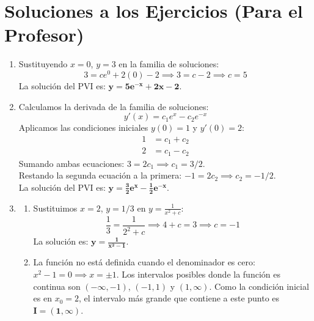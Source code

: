 \documentclass[12pt]{article}
\begin{document}
\newpage
\section*{Soluciones a los Ejercicios (Para el Profesor)}

\begin{enumerate}[label=\textbf{\arabic*.}]
    \item Sustituyendo $x=0$, $y=3$ en la familia de soluciones:
    \[ 3 = c e^{0} + 2(0) - 2 \implies 3 = c - 2 \implies c = 5 \]
    La solución del PVI es: $\mathbf{y = 5e^{-x} + 2x - 2}$.

    \vspace{0.5cm}

    \item Calculamos la derivada de la familia de soluciones:
    \[ y'(x) = c_1 e^x - c_2 e^{-x} \]
    Aplicamos las condiciones iniciales $y(0)=1$ y $y'(0)=2$:
    \begin{align*}
        1 &= c_1 + c_2 \\
        2 &= c_1 - c_2
    \end{align*}
    Sumando ambas ecuaciones: $3 = 2c_1 \implies c_1 = 3/2$. \\
    Restando la segunda ecuación a la primera: $-1 = 2c_2 \implies c_2 = -1/2$. \\
    La solución del PVI es: $\mathbf{y = \frac{3}{2}e^x - \frac{1}{2}e^{-x}}$.

    \vspace{0.5cm}

    \item
    \begin{enumerate}[label=\textbf{\alph*)}]
        \item Sustituimos $x=2$, $y=1/3$ en $y = \frac{1}{x^2 + c}$:
        \[ \frac{1}{3} = \frac{1}{2^2 + c} \implies 4 + c = 3 \implies c = -1 \]
        La solución es: $\mathbf{y = \frac{1}{x^2 - 1}}$.
        
        \item La función no está definida cuando el denominador es cero: $x^2 - 1 = 0 \implies x = \pm 1$.
        Los intervalos posibles donde la función es continua son $(-\infty, -1)$, $(-1, 1)$ y $(1, \infty)$.
        Como la condición inicial es en $x_0 = 2$, el intervalo más grande que contiene a este punto es $\mathbf{I = (1, \infty)}$.
    \end{enumerate}

    \vspace{0.5cm}


\end{enumerate}
\end{document}
